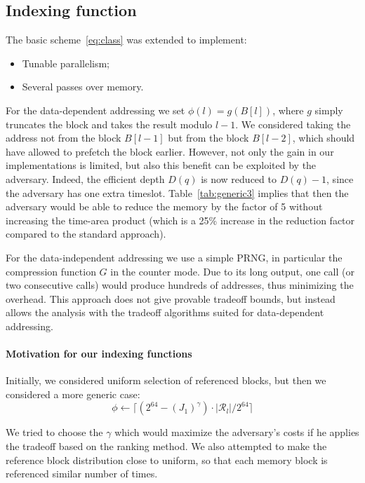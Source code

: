 \documentclass[a4paper]{article}
\begin{document}
 \subsection{Indexing function}  

The basic scheme~\eqref{eq:class} was extended to implement:
\begin{itemize}
  \item Tunable parallelism;
  \item Several passes over memory.
\end{itemize}





  For the data-dependent addressing we set $\phi(l) = g(B[l])$, where $g$ simply truncates the block and takes the result modulo $l-1$. We considered
 taking the address
  not from the block $B[l-1]$ but from the block $B[l-2]$, which should have allowed to prefetch the block earlier. However, not only the gain in our implementations is limited, but also this benefit can be exploited by the adversary. Indeed, the efficient depth $D(q)$ is
 now reduced to $D(q)-1$, since the adversary has one extra timeslot. Table~\ref{tab:generic3} implies that then the adversary would be able to reduce the memory by the factor of 5 without increasing the time-area product (which is a 25\% increase in the reduction factor compared to the standard approach).



 For the data-independent addressing we use a simple PRNG, in particular the compression function $G$ in the counter mode.
  Due to its long output, one call (or two consecutive calls) would produce hundreds of addresses,
 thus minimizing the overhead. This approach does not give provable tradeoff bounds, but instead allows
 the analysis with the  tradeoff algorithms suited for data-dependent addressing.

\paragraph{Motivation for our indexing functions}

Initially, we considered uniform selection of referenced blocks, but then we considered a more generic case:
$$
\phi \leftarrow \lceil(2^{64}-(J_1)^\gamma)\cdot |\mathcal{R}_l|/2^{64} \rceil
$$

We tried to choose the $\gamma$ which would maximize the adversary's costs if he applies the tradeoff based on the ranking method. We also attempted to make the reference block distribution close to uniform, so that each memory block is referenced similar number of times.
\end{document}
